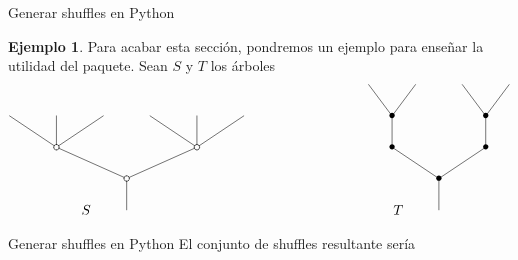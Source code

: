 \documentclass[12pt,aspectratio=169]{beamer}
\numberwithin{equation}{section}
\theoremstyle{definition}
\newtheorem{ex}[teo]{Ejemplo}
\begin{document}
\begin{frame}{Generar shuffles en Python}
    \begin{ex}
        Para acabar esta secci\'on, pondremos un ejemplo para ense\~nar la utilidad del paquete. Sean $S$ y $T$ los \'arboles
    $$
        \xy
        <0.08cm, 0cm>:
        (0.0, 0.0)*{}="1"; %
        (0.0, 10.0)*\cir<2pt>{}="2"; %
        (-22.5, 20.0)*\cir<2pt>{}="3"; %
        (-37.5, 30.0)*{}="4"; %
        (-22.5, 30.0)*{}="5"; %
        (-7.5, 30.0)*{}="6"; %
        (22.5, 20.0)*\cir<2pt>{}="7"; %
        (7.5, 30.0)*{}="8"; %
        (22.5, 30.0)*{}="9"; %
        (37.5, 30.0)*{}="10"; %
        "1";"2" **\dir{-};
        "2";"3" **\dir{-};
        "3";"4" **\dir{-};
        "3";"5" **\dir{-};
        "3";"6" **\dir{-};
        "2";"7" **\dir{-};
        "7";"8" **\dir{-};
        "7";"9" **\dir{-};
        "7";"10" **\dir{-};
        (-13,0)*{S};
        \endxy
        \xy
        <0.08cm, 0cm>:
        (-20, 0.0)*{}="1";
        (20, 10.0)*{}="2";
        \endxy
        \xy
        <0.08cm, 0cm>:
        (0.0, 0.0)*{}="1"; %
        (0.0, 10.0)*=0{\bullet}="2"; %
        (-15.0, 20.0)*=0{\bullet}="3"; %
        (-15.0, 30.0)*=0{\bullet}="4"; %
        (-22.5, 40.0)*{}="5"; %
        (-7.5, 40.0)*{}="6"; %
        (15.0, 20.0)*=0{\bullet}="7"; %
        (15.0, 30.0)*=0{\bullet}="8"; %
        (7.5, 40.0)*{}="9"; %
        (22.5, 40.0)*{}="10"; %
        "1";"2" **\dir{-};
        "2";"3" **\dir{-};
        "3";"4" **\dir{-};
        "4";"5" **\dir{-};
        "4";"6" **\dir{-};
        "2";"7" **\dir{-};
        "7";"8" **\dir{-};
        "8";"9" **\dir{-};
        "8";"10" **\dir{-};
        (-13,0)*{T};
        \endxy
    $$
    \end{ex}
\end{frame}
\begin{frame}{Generar shuffles en Python}
    El conjunto de shuffles resultante ser\'ia
    \begin{center}\end{center}
    
\end{frame}
\end{document}
